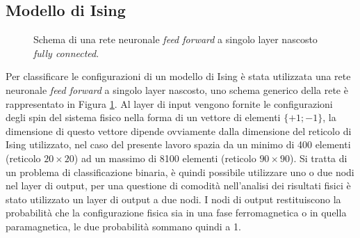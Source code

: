 \documentclass{article}
\begin{document}
\subsection{Modello di Ising}

\begin{figure}
\centering
{}
\caption{Schema di una rete neuronale \emph{feed forward} a singolo layer nascosto \emph{fully connected}.}
\label{fig:ffn}
\end{figure}

Per classificare le configurazioni di un modello di Ising è stata utilizzata una rete neuronale \emph{feed forward} a singolo layer nascosto, uno schema generico della rete è rappresentato in Figura \ref{fig:ffn}.
Al layer di input vengono fornite le configurazioni degli spin del sistema fisico nella forma di un vettore di elementi $\{+1;-1\}$, la dimensione di questo vettore dipende ovviamente dalla dimensione del reticolo di Ising utilizzato, nel caso del presente lavoro spazia da un minimo di 400 elementi (reticolo $20\times20$) ad un massimo di 8100 elementi (reticolo $90\times90$).
Si tratta di un problema di classificazione binaria, è quindi possibile utilizzare uno o due nodi nel layer di output, per una questione di comodità nell'analisi dei risultati fisici è stato utilizzato un layer di output a due nodi.
I nodi di output restituiscono la probabilità che la configurazione fisica sia in una fase ferromagnetica o in quella paramagnetica, le due probabilità sommano quindi a 1.
\end{document}
